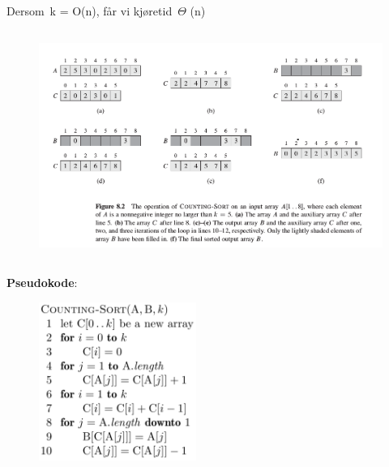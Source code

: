 \documentclass[12pt]{report}
\begin{document}

\setlength{\parskip}{0.0pt}
Dersom k = O(n), får vi kjøretid $ \Theta $ (n)\par




\begin{figure}[H]
\advance\leftskip 2.6in		\includegraphics[width=4.45in,height=2.95in]{./media/image35.png}
\end{figure}



\par

{\fontsize{13pt}{15.6pt}\selectfont \textbf{Pseudokode}:\par}\par




\begin{figure}[H]
	\begin{Center}
		\includegraphics[width=2.02in,height=2.03in]{./media/image36.png}
	\end{Center}
\end{figure}
\end{document}
